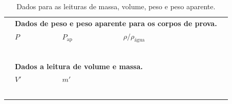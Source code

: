 \begin{table}
\label{Tab:DadosEmpuxo}
	\begin{center}
		\begin{tabular}{cp{25mm}p{25mm}p{25mm}c}
		\toprule
		&\multicolumn{3}{l}{\textbf{Dados de peso e peso aparente para os corpos de prova.}} \\
		\cmidrule{2-4}
		& $P$ & $P_{\textrm{ap}}$ & $\rho/\rho_{\textrm{água}}$ & \\
		\cmidrule{2-4}
		& \cellcolor[gray]{0.89} & \cellcolor[gray]{0.92} & \cellcolor[gray]{0.89} \\
		& \cellcolor[gray]{0.95} & \cellcolor[gray]{0.97} & \cellcolor[gray]{0.95} \\
		& \cellcolor[gray]{0.89} & \cellcolor[gray]{0.92} & \cellcolor[gray]{0.89} \\
		& \cellcolor[gray]{0.95} & \cellcolor[gray]{0.97} & \cellcolor[gray]{0.95} \\
		& \cellcolor[gray]{0.89} & \cellcolor[gray]{0.92} & \cellcolor[gray]{0.89} \\
\\
		&\multicolumn{3}{l}{\textbf{Dados a leitura de volume e massa.}} \\
		\cmidrule{2-3}
		& $V'$ & $m'$ \\
		\cmidrule{2-3}
		& \cellcolor[gray]{0.89} & \cellcolor[gray]{0.92} \\
		& \cellcolor[gray]{0.95} & \cellcolor[gray]{0.97} \\
		& \cellcolor[gray]{0.89} & \cellcolor[gray]{0.92} \\
		& \cellcolor[gray]{0.95} & \cellcolor[gray]{0.97} \\
		& \cellcolor[gray]{0.89} & \cellcolor[gray]{0.92} \\
		\cmidrule{2-3}
		\cmidrule{2-4}
		\bottomrule
		\end{tabular}
	\end{center}
	\caption{Dados para as leituras de massa, volume, peso e peso aparente.}
\end{table}
%
